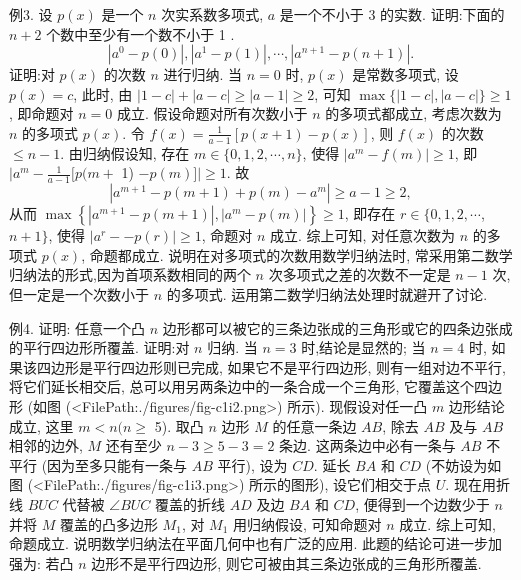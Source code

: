 例3. 设 $p(x)$ 是一个 $n$ 次实系数多项式, $a$ 是一个不小于 3 的实数.
证明:下面的 $n+2$ 个数中至少有一个数不小于 1 .
$$
\left|a^0-p(0)\right|,\left|a^1-p(1)\right|, \cdots,\left|a^{n+1}-p(n+1)\right| .
$$
证明:对 $p(x)$ 的次数 $n$ 进行归纳.
当 $n=0$ 时, $p(x)$ 是常数多项式, 设 $p(x)=c$, 此时, 由 $|1-c|+\mid a- c|\geqslant| a-1 \mid \geqslant 2$, 可知 $\max \{|1-c|,|a-c|\} \geqslant 1$, 即命题对 $n=0$ 成立.
假设命题对所有次数小于 $n$ 的多项式都成立, 考虑次数为 $n$ 的多项式 $p(x)$.
令 $f(x)=\frac{1}{a-1}[p(x+1)-p(x)]$, 则 $f(x)$ 的次数 $\leqslant n-1$. 由归纳假设知, 存在 $m \in\{0,1,2, \cdots, n\}$, 使得 $\left|a^m-f(m)\right| \geqslant 1$, 即 $\mid a^m-\frac{1}{a-1}[p(m+$ 1) $-p(m)] \mid \geqslant 1$. 故
$$
\left|a^{m+1}-p(m+1)+p(m)-a^m\right| \geqslant a-1 \geqslant 2,
$$
从而 $\max \left\{\left|a^{m+1}-p(m+1)\right|,\left|a^m-p(m)\right|\right\} \geqslant 1$, 即存在 $r \in\{0,1,2, \cdots$, $n+1\}$, 使得 $\left|a^r--p(r)\right| \geqslant 1$, 命题对 $n$ 成立.
综上可知, 对任意次数为 $n$ 的多项式 $p(x)$, 命题都成立.
说明在对多项式的次数用数学归纳法时, 常采用第二数学归纳法的形式,因为首项系数相同的两个 $n$ 次多项式之差的次数不一定是 $n-1$ 次, 但一定是一个次数小于 $n$ 的多项式.
运用第二数学归纳法处理时就避开了讨论.



例4. 证明: 任意一个凸 $n$ 边形都可以被它的三条边张成的三角形或它的四条边张成的平行四边形所覆盖.
证明:对 $n$ 归纳.
当 $n=3$ 时,结论是显然的; 当 $n=4$ 时, 如果该四边形是平行四边形则已完成, 如果它不是平行四边形, 则有一组对边不平行, 将它们延长相交后, 总可以用另两条边中的一条合成一个三角形, 它覆盖这个四边形 (如图 (<FilePath:./figures/fig-c1i2.png>) 所示).
现假设对任一凸 $m$ 边形结论成立, 这里 $m<n(n \geqslant$ 5). 取凸 $n$ 边形 $M$ 的任意一条边 $A B$, 除去 $A B$ 及与 $A B$ 相邻的边外, $M$ 还有至少 $n-3 \geqslant 5-3=2$ 条边.
这两条边中必有一条与 $A B$ 不平行 (因为至多只能有一条与 $A B$ 平行), 设为 $C D$. 延长 $B A$ 和 $C D$ (不妨设为如图 (<FilePath:./figures/fig-c1i3.png>) 所示的图形), 设它们相交于点 $U$. 现在用折线 $B U C$ 代替被 $\angle B U C$ 覆盖的折线 $A D$ 及边 $B A$ 和 $C D$, 便得到一个边数少于 $n$ 并将 $M$ 覆盖的凸多边形 $M_1$, 对 $M_1$ 用归纳假设, 可知命题对 $n$ 成立.
综上可知, 命题成立.
说明数学归纳法在平面几何中也有广泛的应用.
此题的结论可进一步加强为: 若凸 $n$ 边形不是平行四边形, 则它可被由其三条边张成的三角形所覆盖.



